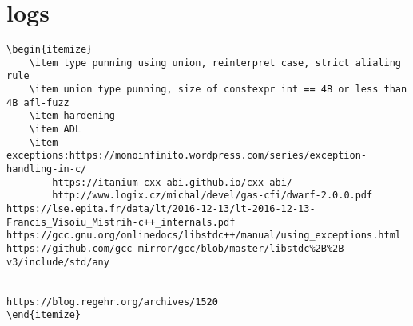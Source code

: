 \section{logs} 
\begin{verbatim}
\begin{itemize}
    \item type punning using union, reinterpret case, strict alialing rule
    \item union type punning, size of constexpr int == 4B or less than 4B afl-fuzz
    \item hardening
    \item ADL
    \item exceptions:https://monoinfinito.wordpress.com/series/exception-handling-in-c/  
        https://itanium-cxx-abi.github.io/cxx-abi/ 
        http://www.logix.cz/michal/devel/gas-cfi/dwarf-2.0.0.pdf
https://lse.epita.fr/data/lt/2016-12-13/lt-2016-12-13-Francis_Visoiu_Mistrih-c++_internals.pdf
https://gcc.gnu.org/onlinedocs/libstdc++/manual/using_exceptions.html
https://github.com/gcc-mirror/gcc/blob/master/libstdc%2B%2B-v3/include/std/any


https://blog.regehr.org/archives/1520
\end{itemize}
\end{verbatim}

